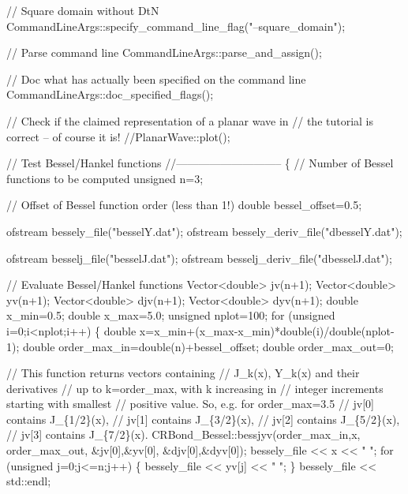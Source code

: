 \begin{DoxyCodeInclude}
{{{{ \textcolor{comment}{// Square domain without DtN}
 CommandLineArgs::specify\_command\_line\_flag(\textcolor{stringliteral}{"--square\_domain"});

 \textcolor{comment}{// Parse command line}
 CommandLineArgs::parse\_and\_assign(); 
 
 \textcolor{comment}{// Doc what has actually been specified on the command line}
 CommandLineArgs::doc\_specified\_flags();

 \textcolor{comment}{// Check if the claimed representation of a planar wave in}
 \textcolor{comment}{// the tutorial is correct -- of course it is!}
 \textcolor{comment}{//PlanarWave::plot();}

 \textcolor{comment}{// Test Bessel/Hankel functions}
 \textcolor{comment}{//-----------------------------}
 \{
  \textcolor{comment}{// Number of Bessel functions to be computed}
  \textcolor{keywordtype}{unsigned} n=3;
  
  \textcolor{comment}{// Offset of Bessel function order (less than 1!)}
  \textcolor{keywordtype}{double} bessel\_offset=0.5;
  
  ofstream bessely\_file(\textcolor{stringliteral}{"besselY.dat"});
  ofstream bessely\_deriv\_file(\textcolor{stringliteral}{"dbesselY.dat"});
  
  ofstream besselj\_file(\textcolor{stringliteral}{"besselJ.dat"});
  ofstream besselj\_deriv\_file(\textcolor{stringliteral}{"dbesselJ.dat"});
  
  \textcolor{comment}{// Evaluate Bessel/Hankel functions}
  Vector<double> jv(n+1);
  Vector<double> yv(n+1);
  Vector<double> djv(n+1);
  Vector<double> dyv(n+1);
  \textcolor{keywordtype}{double} x\_min=0.5;
  \textcolor{keywordtype}{double} x\_max=5.0;
  \textcolor{keywordtype}{unsigned} nplot=100;
  \textcolor{keywordflow}{for} (\textcolor{keywordtype}{unsigned} i=0;i<nplot;i++)
   \{
    \textcolor{keywordtype}{double} x=x\_min+(x\_max-x\_min)*\textcolor{keywordtype}{double}(i)/double(nplot-1);
    \textcolor{keywordtype}{double} order\_max\_in=double(n)+bessel\_offset;
    \textcolor{keywordtype}{double} order\_max\_out=0;
    
    \textcolor{comment}{// This function returns vectors containing }
    \textcolor{comment}{// J\_k(x), Y\_k(x) and their derivatives}
    \textcolor{comment}{// up to k=order\_max, with k increasing in}
    \textcolor{comment}{// integer increments starting with smallest}
    \textcolor{comment}{// positive value. So, e.g. for order\_max=3.5}
    \textcolor{comment}{// jv[0] contains J\_\{1/2\}(x),}
    \textcolor{comment}{// jv[1] contains J\_\{3/2\}(x),}
    \textcolor{comment}{// jv[2] contains J\_\{5/2\}(x),}
    \textcolor{comment}{// jv[3] contains J\_\{7/2\}(x).}
    CRBond\_Bessel::bessjyv(order\_max\_in,x,
                           order\_max\_out,
                           &jv[0],&yv[0],
                           &djv[0],&dyv[0]);
    bessely\_file << x << \textcolor{stringliteral}{" "};
    \textcolor{keywordflow}{for} (\textcolor{keywordtype}{unsigned} j=0;j<=n;j++)
     \{
      bessely\_file << yv[j] << \textcolor{stringliteral}{" "};
     \}
    bessely\_file << std::endl;
    
}}}}
\end{DoxyCodeInclude}
